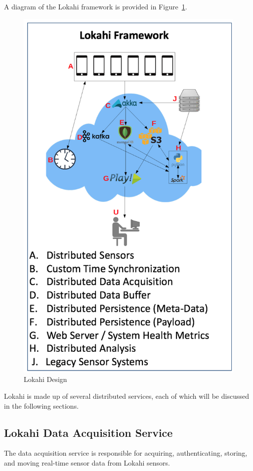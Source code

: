 A diagram of the Lokahi framework is provided in Figure~\ref{fig:lokahi}.


\begin{figure}
	\centering
	\includegraphics[]{figures/lokahi.png}
	\caption{Lokahi Design}\label{fig:lokahi}
\end{figure}

Lokahi is made up of several distributed services, each of which will be discussed in the following sections.

\subsection{Lokahi Data Acquisition Service}\label{subsec:lokahi-data-acquisition-service}
The data acquisition service is responsible for acquiring, authenticating, storing, and moving real-time sensor data from Lokahi sensors.

